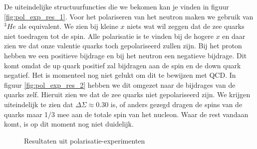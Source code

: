 \documentclass[../main.tex]{subfiles}
\begin{document}
De uiteindelijke structuurfuncties die we bekomen kan je vinden in figuur \ref{fig:pol_exp_res_1}. Voor het polariseren van het neutron maken we gebruik van $^3He$ als equivalent. We zien bij kleine $x$ niets wat wil zeggen dat de zee quarks niet toedragen tot de spin. Alle polarisatie is te vinden bij de hogere $x$ en daar zien we dat onze valentie quarks toch gepolariseerd zullen zijn. Bij het proton hebben we een positieve bijdrage en bij het neutron een negatieve bijdrage. Dit komt omdat de up quark positief zal bijdragen aan de spin en de down quark negatief. Het is momenteel nog niet gelukt om dit te bewijzen met QCD. In figuur \ref{fig:pol_exp_res_2} hebben we dit omgezet naar de bijdrages van de quarks zelf. Hieruit zien we dat de zee quarks niet gepolariseerd zijn. We krijgen uiteindelijk te zien dat $\Delta\Sigma \approx 0.30$ is, of anders gezegd dragen de spins van de quarks maar 1/3 mee aan de totale spin van het nucleon. Waar de rest vandaan komt, is op dit moment nog niet duidelijk.

\begin{figure}[h]
    \centering
    \hfill
    \caption{Resultaten uit polarisatie-experimenten}
\end{figure}
\end{document}
